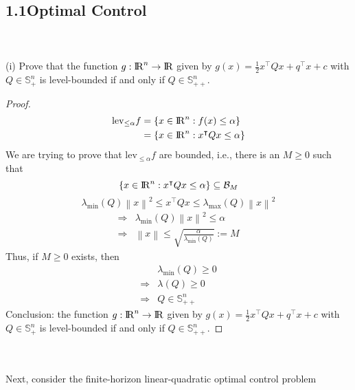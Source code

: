 \documentclass[a4paper,11pt,reqno]{amsart}
\newcommand{\R}{{\rm I\!R}}
\newcommand{\tran}{\intercal}
\begin{document}
\subsection*{1.1\quad Optimal Control}\label{sec:q1}
\
\\ \\
(i) Prove that the function $g:\R^n\to \R$ given by $g(x) = \frac{1}{2}x^{\tran}Qx+q^{\tran}x+c$ with $Q\in \mathbb{S}^n_+$ is level-bounded
if and only if $Q\in \mathbb{S}^n_{++}$.
\\ 
\begin{proof}
\begin{align}
    \mathrm{lev}_{\leq \alpha}f&=\{x\in\R^n:f(x)\leq\alpha\}\notag\\
    &=\{x\in\R^n:x^{\tran}Qx\leq\alpha\}
\end{align}
We are trying to prove that $\mathrm{lev}_{\leq \alpha}f$ are bounded, i.e., there is an $M\geq 0$ such that
\begin{equation}
    \{x\in\R^n:x^{\tran}Qx\leq\alpha\}\subseteq \mathcal{B}_M
\end{equation}
\begin{equation}
    \lambda_{\mathrm{min}}(Q)\left\lVert x\right\rVert ^2\leq x^{\tran}Qx\leq \lambda_{\mathrm{max}}(Q)\left\lVert x\right\rVert ^2
\end{equation}
\begin{align}
    \Longrightarrow &\lambda_{\mathrm{min}}(Q)\left\lVert x\right\rVert ^2\leq \alpha\\
    \Longrightarrow &\left\lVert x\right\rVert \leq \sqrt{\frac{\alpha}{\lambda_{\mathrm{min}}(Q)}}:=M
\end{align}
Thus, if $M\geq 0$ exists, then
\begin{align}
    &\lambda_{\mathrm{min}}(Q)\geq 0\\
    \Longrightarrow&\lambda(Q)\geq 0\\
    \Longrightarrow &Q\in \mathbb{S}^n_{++}
\end{align}
Conclusion: the function $g:\R^n\to \R$ given by $g(x) = \frac{1}{2}x^{\tran}Qx+q^{\tran}x+c$ with $Q\in \mathbb{S}^n_+$ is level-bounded
if and only if $Q\in \mathbb{S}^n_{++}$.
\end{proof}
\
\\ \\
Next, consider the finite-horizon linear-quadratic optimal control problem
\end{document}
